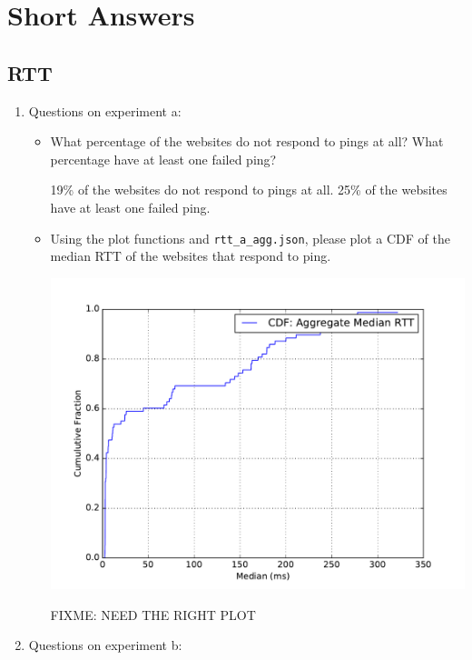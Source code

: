 \documentclass[10pt]{article}
\begin{document}
\section*{Short Answers}

\subsection*{RTT}

\begin{enumerate}
\item Questions on experiment a:

\begin{itemize}
\item What percentage of the websites do not respond to pings at all? What percentage have at least one failed ping?

19\% of the websites do not respond to pings at all. 25\% of the websites have at least one failed ping.

\item Using the plot functions and \texttt{rtt\_a\_agg.json}, please plot a CDF of the median RTT of the websites that respond to ping.

\begin{center}
\includegraphics[scale=0.5]{rtt_a}
\end{center}
FIXME: NEED THE RIGHT PLOT

\end{itemize}

\item Questions on experiment b:

\begin{itemize}


\end{itemize}
\end{enumerate}
\end{document}
